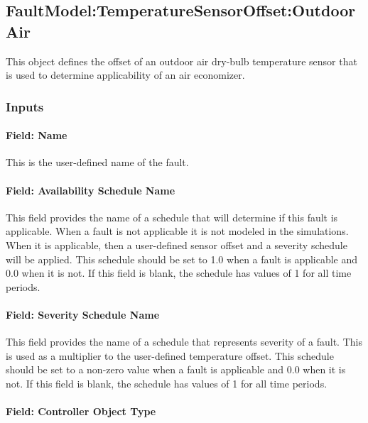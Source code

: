 \subsection{FaultModel:TemperatureSensorOffset:OutdoorAir}\label{faultmodeltemperaturesensoroffsetoutdoorair}

This object defines the offset of an outdoor air dry-bulb temperature sensor that is used to determine applicability of an air economizer.

\subsubsection{Inputs}\label{inputs-029}

\paragraph{Field: Name}\label{field-name-028}

This is the user-defined name of the fault.

\paragraph{Field: Availability Schedule Name}\label{field-availability-schedule-name-011}

This field provides the name of a schedule that will determine if this fault is applicable. When a fault is not applicable it is not modeled in the simulations. When it is applicable, then a user-defined sensor offset and a severity schedule will be applied. This schedule should be set to 1.0 when a fault is applicable and 0.0 when it is not. If this field is blank, the schedule has values of 1 for all time periods.

\paragraph{Field: Severity Schedule Name}

This field provides the name of a schedule that represents severity of a fault. This is used as a multiplier to the user-defined temperature offset. This schedule should be set to a non-zero value when a fault is applicable and 0.0 when it is not. If this field is blank, the schedule has values of 1 for all time periods.

\paragraph{Field: Controller Object Type}\label{field-controller-object-type}

